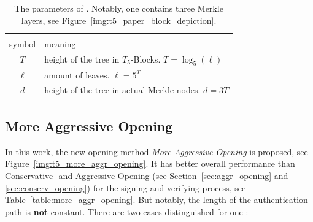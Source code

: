 \begin{table}
\centering
\begin{tabular}{c l}
 \hline\noalign{\smallskip}
 \multicolumn{2}{c}{\textbf{\extree Parameter}} \\
 symbol & meaning \\
 \hline\noalign{\smallskip} 
 $T$ & height of the tree in $T_5$-Blocks. $T = \log_5(\ell)$ \\
  $\ell$ & amount of leaves. $\ell = 5^T$ \\
 $d$ & height of the tree in actual Merkle nodes. $d = 3T$ \\
 \hline
\end{tabular}
\caption{The parameters of \extree. Notably, one \tfblock contains three Merkle layers, see Figure~\ref{img:t5_paper_block_depiction}.} %
\label{table:t5_ext_parameter}
\end{table}

\subsection{More Aggressive Opening}
\label{sec:more_aggr_opening}
In this work, the new opening method \textit{More Aggressive Opening} is proposed, see Figure~\ref{img:t5_more_aggr_opening}. It has better overall performance than Conservative- and Aggressive Opening (see Section~\ref{sec:aggr_opening} and \ref{sec:conserv_opening}) for the signing and verifying process, see Table~\ref{table:more_aggr_opening}. But notably, the length of the authentication path is \textbf{not} constant.
There are two cases distinguished for one \tfblock:

